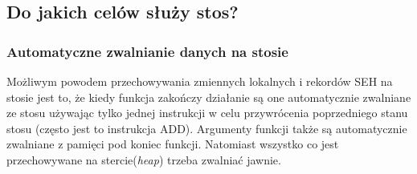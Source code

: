 \subsection{Do jakich celów służy stos?}








\subsubsection{Automatyczne zwalnianie danych na stosie}
Możliwym powodem przechowywania zmiennych lokalnych i rekordów SEH na stosie jest to, że kiedy funkcja zakończy działanie są one automatycznie zwalniane ze stosu używając tylko jednej instrukcji w celu przywrócenia poprzedniego stanu stosu (często jest to instrukcja ADD). Argumenty funkcji także są automatycznie zwalniane z pamięci pod koniec funkcji. Natomiast wszystko co jest przechowywane na stercie(\emph{heap}) trzeba zwalniać jawnie.





